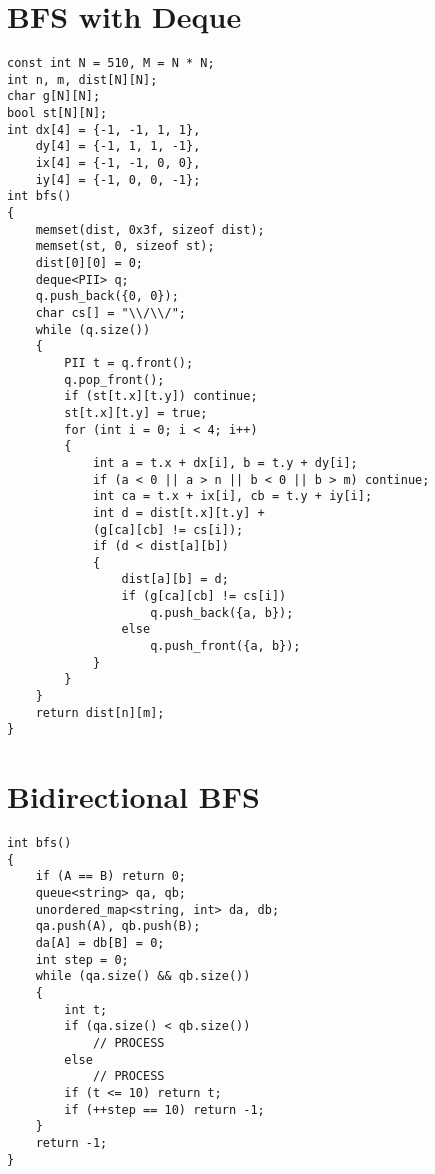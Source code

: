 \section{BFS with Deque}
\begin{lstlisting}
const int N = 510, M = N * N;
int n, m, dist[N][N];
char g[N][N];
bool st[N][N];
int dx[4] = {-1, -1, 1, 1}, 
    dy[4] = {-1, 1, 1, -1}, 
    ix[4] = {-1, -1, 0, 0}, 
    iy[4] = {-1, 0, 0, -1};
int bfs()
{
    memset(dist, 0x3f, sizeof dist);
    memset(st, 0, sizeof st);
    dist[0][0] = 0;
    deque<PII> q;
    q.push_back({0, 0});
    char cs[] = "\\/\\/";
    while (q.size())
    {
        PII t = q.front();
        q.pop_front();
        if (st[t.x][t.y]) continue;
        st[t.x][t.y] = true;
        for (int i = 0; i < 4; i++)
        {
            int a = t.x + dx[i], b = t.y + dy[i];
            if (a < 0 || a > n || b < 0 || b > m) continue;
            int ca = t.x + ix[i], cb = t.y + iy[i];
            int d = dist[t.x][t.y] + 
            (g[ca][cb] != cs[i]);
            if (d < dist[a][b])
            {
                dist[a][b] = d;
                if (g[ca][cb] != cs[i])
                    q.push_back({a, b});
                else
                    q.push_front({a, b});
            }
        }
    }
    return dist[n][m];
}
\end{lstlisting}
\section{Bidirectional BFS}
\begin{lstlisting}
int bfs()
{
    if (A == B) return 0;
    queue<string> qa, qb;
    unordered_map<string, int> da, db;
    qa.push(A), qb.push(B);
    da[A] = db[B] = 0;
    int step = 0;
    while (qa.size() && qb.size())
    {
        int t;
        if (qa.size() < qb.size())
            // PROCESS
        else 
            // PROCESS
        if (t <= 10) return t;
        if (++step == 10) return -1;
    }
    return -1;
}
\end{lstlisting}
